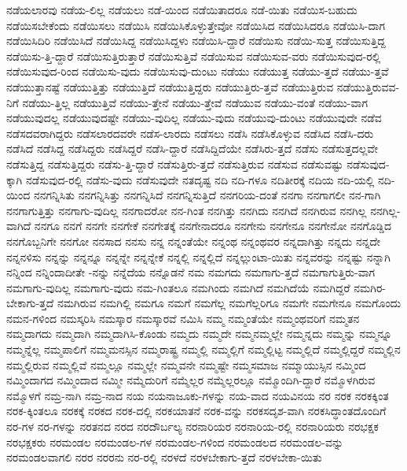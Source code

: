{ನಡೆಯಲಾರವು
ನಡೆಯ-ಲಿಲ್ಲ
ನಡೆಯಲು
ನಡೆ-ಯಿಂದ
ನಡೆಯಿತಾದರೂ
ನಡೆ-ಯಿತು
ನಡೆಯಿಸ-ಬಹುದು
ನಡೆಯಿಸಬೇಕೆಂದು
ನಡೆಯಿಸಲು
ನಡೆಯಿಸಿ
ನಡೆಯಿಸಿಕೊಳ್ಳುತ್ತೇವೋ
ನಡೆಯಿಸಿದ
ನಡೆಯಿಸಿದರೂ
ನಡೆಯಿಸಿ-ದಾಗ
ನಡೆಯಿಸಿದಿರಿ
ನಡೆಯಿಸಿದೆ
ನಡೆಯಿಸಿದ್ದ
ನಡೆಯಿಸಿದ್ದಳು
ನಡೆಯಿಸಿ-ದ್ದಾರೆ
ನಡೆಯಿಸು
ನಡೆಯಿ-ಸುತ್ತ
ನಡೆಯಿಸುತ್ತಿದ್ದ
ನಡೆಯಿಸು-ತ್ತಿ-ದ್ದಾರೆ
ನಡೆಯಿಸುತ್ತಿರುತ್ತಾರೆ
ನಡೆಯಿಸುತ್ತಿವೆ
ನಡೆಯಿಸುವ
ನಡೆಯಿಸುವ-ವರು
ನಡೆಯಿಸುವುದ-ರಲ್ಲಿ
ನಡೆಯಿಸುವುದ-ರಿಂದ
ನಡೆಯಿಸು-ವುದು
ನಡೆಯಿಸುವು-ದುಂಟು
ನಡೆಯು
ನಡೆಯುತ್ತ
ನಡೆಯು-ತ್ತದೆ
ನಡೆಯು-ತ್ತವೆ
ನಡೆಯುತ್ತಾನಷ್ಟೆ
ನಡೆಯುತ್ತಿತ್ತು
ನಡೆಯುತ್ತಿದೆ
ನಡೆಯುತ್ತಿದ್ದರು
ನಡೆಯುತ್ತಿರು-ತ್ತವೆ
ನಡೆಯುತ್ತಿರುವ
ನಡೆಯುತ್ತಿರುವವ-ನಿಗೆ
ನಡೆಯು-ತ್ತಿಲ್ಲ
ನಡೆಯುತ್ತಿವೆ
ನಡೆಯು-ತ್ತೇನೆ
ನಡೆಯು-ತ್ತೇವೆ
ನಡೆಯುವ
ನಡೆಯು-ವಂತೆ
ನಡೆಯು-ವಾಗ
ನಡೆಯುವುದಲ್ಲ
ನಡೆಯುವುದಷ್ಟೇ
ನಡೆಯು-ವುದಿಲ್ಲ
ನಡೆಯು-ವುದು
ನಡೆಯುವು-ದುಂಟು
ನಡೆಯುವುದೇ
ನಡೆವ
ನಡೆಸದವರಾಗಿದ್ದರು
ನಡೆಸಲಾರದವರೇ
ನಡೆಸ-ಲಾರದು
ನಡೆಸಲು
ನಡೆಸಿ
ನಡೆಸಿಕೊಳ್ಳುವ
ನಡೆಸಿದ
ನಡೆಸಿ-ದರು
ನಡೆಸಿದೆ
ನಡೆಸಿದ್ದ
ನಡೆಸಿದ್ದರು
ನಡೆಸಿದ್ದರೆ
ನಡೆಸಿ-ದ್ದಾರೆ
ನಡೆಸಿದ್ದಿದೆಯೇ
ನಡೆಸಿರು-ತ್ತದೆ
ನಡೆಸು
ನಡೆಸುತ್ತದಲ್ಲವೇ
ನಡೆಸುತ್ತಿದ್ದ
ನಡೆಸುತ್ತಿದ್ದರು
ನಡೆಸು-ತ್ತಿ-ದ್ದಾರೆ
ನಡೆಸುತ್ತಿರು-ತ್ತದೆ
ನಡೆಸುತ್ತಿರುವ
ನಡೆಸುವ
ನಡೆಸುವಷ್ಟು
ನಡೆಸುವುದ-ಕ್ಕಾಗಿ
ನಡೆಸುವುದ-ರಲ್ಲಿ
ನಡೆಸು-ವುದು
ನಡೆಸುವುದೇ
ನತದೃಷ್ಟ
ನದಿ
ನದಿ-ಗಳೂ
ನದಿತೀರಕ್ಕೆ
ನದಿಯ
ನದಿ-ಯಲ್ಲಿ
ನದಿ-ಯಿಂದ
ನನಗನ್ನಿಸಿತು
ನನಗನ್ನಿಸಿತ್ತು
ನನಗನ್ನಿಸಿದೆ
ನನಗನ್ನಿಸುತ್ತಿದೆ
ನನಗರಿಯ-ದಂತೆ
ನನಗಾ
ನನಗಾಗಲೀ
ನನ-ಗಾಗಿ
ನನಗಾಗುತ್ತಿತ್ತು
ನನಗಾಗು-ವುದಿಲ್ಲ
ನನಗಾದರೋ
ನನ-ಗಿಂತ
ನನಗಿತ್ತು
ನನಗಿದು
ನನಗಿದೆ
ನನಗಿರುವ
ನನಗಿಲ್ಲ
ನನಗಿಲ್ಲ-ವಾಗಿದೆ
ನನಗೂ
ನನಗೆ
ನನಗೇ
ನನಗೇಕೆ
ನನಗೇತಕ್ಕೆ
ನನಗೇನಾದರೂ
ನನಗೇನು
ನನಗೇನೂ
ನನಗೇನೋ
ನನಗೊಡ್ಡಿದ
ನನಗೊಬ್ಬನಿಗೇ
ನನಗೋ
ನನಸಾದ
ನನಸು
ನನ್ನ
ನನ್ನಂತೆಯೇ
ನನ್ನಂಥ
ನನ್ನಂಥವರ
ನನ್ನದಾಗಿತ್ತು
ನನ್ನದು
ನನ್ನದೇ
ನನ್ನನಳಿಸು
ನನ್ನನ್ನು
ನನ್ನನ್ನೂ
ನನ್ನನ್ನೇ
ನನ್ನನ್ನೇಕೆ
ನನ್ನಲ್ಲಿ
ನನ್ನಲ್ಲಿದೆ
ನನ್ನಲ್ಲುಂಟಾ-ಯಿತು
ನನ್ನವರನ್ನು
ನನ್ನಷ್ಟು
ನನ್ನಾಗಿ
ನನ್ನಿಂದ
ನನ್ನಿಂದಾದೀತೇ
-ನನ್ನು
ನನ್ನೆದೆಯ
ನನ್ನೊಡನೆ
ನಮ
ನಮಗದು
ನಮಗಾಗು-ತ್ತದೆ
ನಮಗಾಗುತ್ತಿರು-ವಾಗ
ನಮಗಾಗು-ವುದಿಲ್ಲ
ನಮಗಾಗು-ವುದು
ನಮ-ಗಿಂತಲೂ
ನಮಗಿಂದು
ನಮಗಿದೆ
ನಮಗಿದೆಯೆ
ನಮಗಿದ್ದರೆ
ನಮಗಿರ-ಬೇಕಾಗು-ತ್ತದೆ
ನಮಗಿರುವ
ನಮಗಿಲ್ಲಿ
ನಮಗೂ
ನಮಗೆ
ನಮಗೆಲ್ಲ
ನಮಗೆಲ್ಲರಿಗೂ
ನಮಗೇ
ನಮಗೇನೂ
ನಮಗೊಂದು
ನಮನ-ಗಳಿಂದ
ನಮಸ್ಕರಿಸಿ
ನಮಸ್ಕಾರ
ನಮಸ್ಕಾರವೆ
ನಮಿಸಿ
ನಮ್ಮ
ನಮ್ಮಂತೆಯೇ
ನಮ್ಮಂಥವರಿಗೆ
ನಮ್ಮತನ
ನಮ್ಮದಾಗದು
ನಮ್ಮದಾಗಿ
ನಮ್ಮದಾಗಿಸಿ-ಕೊಂಡು
ನಮ್ಮದು
ನಮ್ಮದೇ
ನಮ್ಮನಮ್ಮಲ್ಲೇ
ನಮ್ಮನ್ನದು
ನಮ್ಮನ್ನು
ನಮ್ಮನ್ನೂ
ನಮ್ಮನ್ನೆಲ್ಲ
ನಮ್ಮಪಾಲಿಗೆ
ನಮ್ಮಮನಸ್ಸಿನ
ನಮ್ಮರಾಷ್ಟ್ರ
ನಮ್ಮಲ್ಲಿ
ನಮ್ಮಲ್ಲಿಗೆ
ನಮ್ಮಲ್ಲಿಟ್ಟ
ನಮ್ಮಲ್ಲಿದೆ
ನಮ್ಮಲ್ಲಿದ್ದರೆ
ನಮ್ಮಲ್ಲಿನ
ನಮ್ಮಲ್ಲಿರುವ
ನಮ್ಮಲ್ಲಿವೆ
ನಮ್ಮಲ್ಲೂ
ನಮ್ಮಲ್ಲೇ
ನಮ್ಮವನೇ
ನಮ್ಮಷ್ಟೇ
ನಮ್ಮಸಮಾಜ
ನಮ್ಮಾಯುಸ್ಸಿನ
ನಮ್ಮಿಂದ
ನಮ್ಮಿಂದಾಗದ
ನಮ್ಮಿಂದಾದ
ನಮ್ಮೀ
ನಮ್ಮೆದುರಿಗೆ
ನಮ್ಮೆಲ್ಲರ
ನಮ್ಮೆಲ್ಲರಲ್ಲೂ
ನಮ್ಮೊಂದಿಗಿ-ದ್ದಾರೆ
ನಮ್ಮೊಳಗಿರುವ
ನಮ್ಮೊಳಗೆ
ನಮ್ರ-ನಾಗಿ
ನಮ್ರ-ನಾದ
ನಯ
ನಯನಾಜೂಕು-ಗಳನ್ನು
ನಯ-ವಾದ
ನಯವಿನಯ
ನರ
ನರಕ
ನರಕಕ್ಕಿಂತ
ನರಕ-ಕ್ಕಿಂತಲೂ
ನರಕಕ್ಕೆ
ನರಕದ
ನರಕ-ದಲ್ಲಿ
ನರಕಯಾತನೆ
ನರಕ-ವನ್ನು
ನರಕಸದೃಶ-ವಾಗಿ
ನರಕಸಿದ್ಧಾಂತದೊಂದಿಗೆ
ನರ-ಗಳ
ನರ-ಗಳನ್ನು
ನರತನದ
ನರದ
ನರದೌರ್ಬಲ್ಯ
ನರನಾರಿಯರ
ನರನಾರಿಯ-ರಲ್ಲಿ
ನರನಾರಿಯರು
ನರಭಕ್ಷಕ
ನರಭಕ್ಷಕರು
ನರಮಂಡಲ
ನರಮಂಡಲ-ಗಳ
ನರಮಂಡಲ-ಗಳಿಂದ
ನರಮಂಡಲದ
ನರಮಂಡಲ-ವನ್ನು
ನರಮಂಡಲವಾಗಲಿ
ನರರ
ನರರನು
ನರ-ರಲ್ಲಿ
ನರಳದೆ
ನರಳಬೇಕಾಗು-ತ್ತದೆ
ನರಳಬೇಕಾ-ಯಿತು
}
